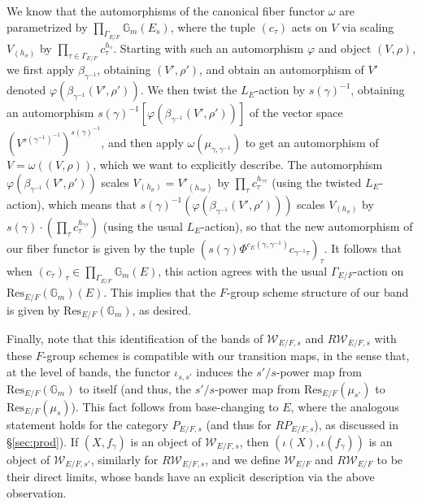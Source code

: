 \documentclass[11pt]{amsart}
\theoremstyle{definition}
\newcommand{\mc}{\mathcal}
\begin{document}
We know that the automorphisms of the canonical fiber functor $\omega$ are parametrized by $\prod_{\Gamma_{E/F}} \mathbb{G}_{m}(E_{s})$, where the tuple $(c_{\tau})$ acts on $V$ via scaling $V_{(h_{\sigma})}$ by $\prod\limits_{\tau \in \Gamma_{E/F}} c_{\tau}^{h_{\tau}}$. Starting with such an automorphism $\varphi$ and object $(V, \rho)$, we first apply $\beta_{\gamma^{-1}}$, obtaining $(V', \rho')$, and obtain an automorphism of $V'$ denoted $\varphi(\beta_{\gamma^{-1}}(V',\rho'))$. We then twist the $L_{E}$-action by $s(\gamma)^{-1}$, obtaining an automorphism $s(\gamma)^{-1}[\varphi(\beta_{\gamma^{-1}}(V',\rho'))]$ of the vector space $(V^{s(\gamma^{-1})^{-1}})^{s(\gamma)^{-1}}$, and then apply $\omega(\mu_{\gamma,\gamma^{-1}})$ to get an automorphism of $V = \omega((V,\rho))$, which we want to explicitly describe. The automorphism $\varphi(\beta_{\gamma^{-1}}(V',\rho'))$ scales $V_{(h_{\sigma})} = V'_{(h_{\gamma\sigma})}$ by $\prod_{\tau} c_{\tau}^{h_{\gamma \tau}}$ (using the twisted $L_{E}$-action), which means that $s(\gamma)^{-1}(\varphi(\beta_{\gamma^{-1}}(V',\rho')))$ scales $V_{(h_{\sigma})}$ by $s(\gamma) \cdot (\prod_{\tau} c_{\tau}^{h_{\gamma \tau}})$ (using the usual $L_{E}$-action), so that the new automorphism of our fiber functor is given by the tuple $(s(\gamma)\Phi^{c_{E}(\gamma,\gamma^{-1})}c_{\gamma^{-1}\tau})_{\tau}$. It follows that when $(c_{\tau})_{\tau} \in \prod_{\Gamma_{E/F}} \mathbb{G}_{m}(E)$, this action agrees with the usual $\Gamma_{E/F}$-action on $\text{Res}_{E/F}(\mathbb{G}_{m})(E)$. This implies that the $F$-group scheme structure of our band is given by $\text{Res}_{E/F}(\mathbb{G}_{m})$, as desired.

Finally, note that this identification of the bands of $\mc{W}_{E/F,s}$ and $R\mc{W}_{E/F,s}$ with these $F$-group schemes is compatible with our transition maps, in the sense that, at the level of bands, the functor $\iota_{s,s'}$ induces the $s'/s$-power map from $\text{Res}_{E/F}(\mathbb{G}_{m})$ to itself (and thus, the $s'/s$-power map from $\text{Res}_{E/F}(\mu_{s'})$ to $\text{Res}_{E/F}(\mu_{s})$). This fact follows from base-changing to $E$, where the analogous statement holds for the category $P_{E/F,s}$ (and thus for $RP_{E/F,s}$), as discussed in \S \ref{sec:prod}). If $(X, f_{\gamma})$ is an object of $\mc{W}_{E/F,s}$, then $(\iota(X), \iota(f_{\gamma}))$ is an object of $\mc{W}_{E/F,s'}$, similarly for $R\mc{W}_{E/F,s}$, and we define $\mc{W}_{E/F}$ and $R\mc{W}_{E/F}$ to be their direct limits, whose bands have an explicit description via the above observation.
\end{document}
